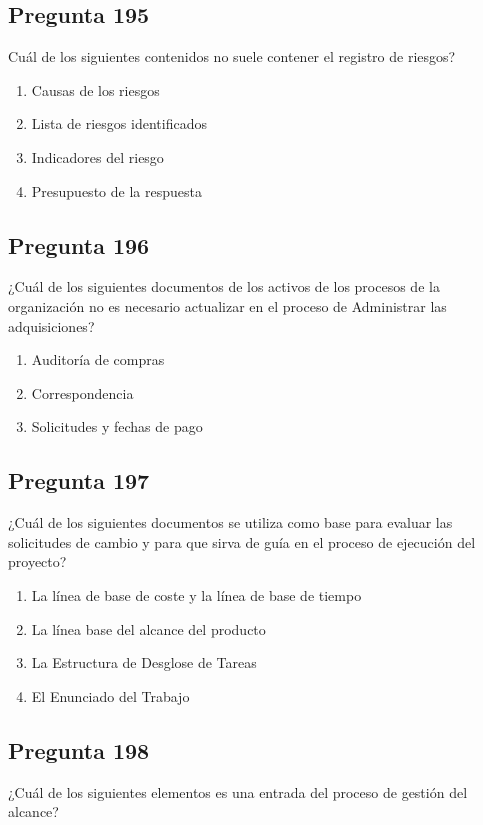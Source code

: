 \documentclass[11pt,a4paper]{article}
\begin{document}
\subsection*{Pregunta 195}
Cuál de los siguientes contenidos no suele contener el registro de riesgos?

\begin{enumerate}[label=\alph*)]
  \item Causas de los riesgos
  \item Lista de riesgos identificados
  \item Indicadores del riesgo
  \item Presupuesto de la respuesta
\end{enumerate}

\subsection*{Pregunta 196}
¿Cuál de los siguientes documentos de los activos de los procesos de la organización no es necesario actualizar en el proceso de Administrar las adquisiciones?

\begin{enumerate}[label=\alph*)]
  \item Auditoría de compras
  \item Correspondencia
  \item Solicitudes y fechas de pago
\end{enumerate}

\subsection*{Pregunta 197}
¿Cuál de los siguientes documentos se utiliza como base para evaluar las solicitudes de cambio y para que sirva de guía en el proceso de ejecución del proyecto?

\begin{enumerate}[label=\alph*)]
  \item La línea de base de coste y la línea de base de tiempo
  \item La línea base del alcance del producto
  \item La Estructura de Desglose de Tareas
  \item El Enunciado del Trabajo
\end{enumerate}

\subsection*{Pregunta 198}
¿Cuál de los siguientes elementos es una entrada del proceso de gestión del alcance?
\end{document}
